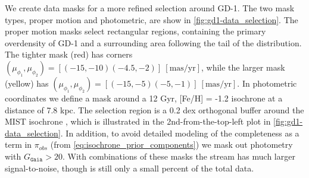 \documentclass[twocolumn]{aastex631}
\newcommand{\stream}[1]{#1}
\newcommand{\dataarchive}[1]{\texttt{#1}}
\newcommand{\Gaia}{\dataarchive{Gaia}}
\newcommand{\mcal}[1]{\mathcal{#1}}
\newcommand{\prior}{\mcal{\pi}}
\newcommand{\unit}[1]{[\text{#1}]}
\begin{document}
        We create data masks for a more refined selection around \stream{GD-1}.
        The two mask types, proper motion and photometric, are show in
        \autoref{fig:gd1-data_selection}.  The proper motion masks select
        rectangular regions, containing the primary overdensity of \stream{GD-1}
        and a surrounding area following the tail of the distribution.  The
        tighter mask (red) has corners $(\mu_{\phi_1}, \mu_{\phi_2}) =
        [(-15,-10) (-4.5, -2)] \ \unit{mas/yr}$, while the larger mask (yellow)
        has $(\mu_{\phi_1}, \mu_{\phi_2}) = [(-15,-5) (-5, -1)] \
        \unit{mas/yr}$.  In photometric coordinates we define a mask around
        a 12 Gyr, [Fe/H] = -1.2 isochrone at a distance of 7.8 kpc.
        The selection region is a 0.2 dex orthogonal buffer around the MIST
        isochrone \citep[using][]{brutus}, which is illustrated in the
        2nd-from-the-top-left plot in \autoref{fig:gd1-data_selection}.  In
        addition, to avoid detailed modeling of the completeness as a term in
        $\prior_{obs}$ (from \autoref{eq:isochrone_prior_components}) we mask out
        photometry with $G_{\Gaia{}} > 20$.  With combinations of these masks
        the stream has much larger signal-to-noise, though is still only a small
        percent of the total data.
\end{document}
